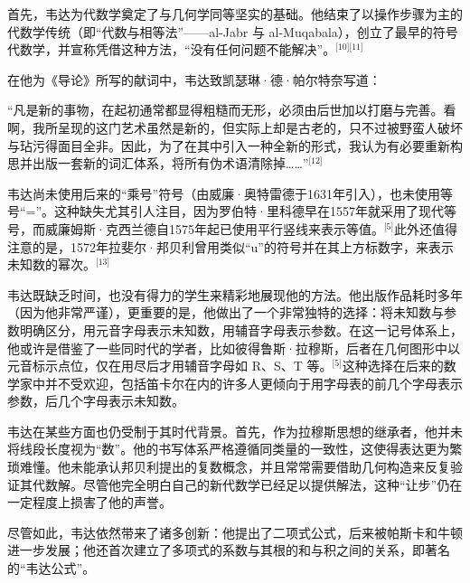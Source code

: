 首先，韦达为代数学奠定了与几何学同等坚实的基础。他结束了以操作步骤为主的代数学传统（即“代数与相等法”——al-Jabr 与 al-Muqabala），创立了最早的符号代数学，并宣称凭借这种方法，“没有任何问题不能解决”。\(^\text{[10][11]}\)

在他为《导论》所写的献词中，韦达致凯瑟琳·德·帕尔特奈写道：

“凡是新的事物，在起初通常都显得粗糙而无形，必须由后世加以打磨与完善。看啊，我所呈现的这门艺术虽然是新的，但实际上却是古老的，只不过被野蛮人破坏与玷污得面目全非。因此，为了在其中引入一种全新的形式，我认为有必要重新构思并出版一套新的词汇体系，将所有伪术语清除掉……”\(^\text{[12]}\)

韦达尚未使用后来的“乘号”符号（由威廉·奥特雷德于1631年引入），也未使用等号“=”。这种缺失尤其引人注目，因为罗伯特·里科德早在1557年就采用了现代等号，而威廉姆斯·克西兰德自1575年起已使用平行竖线来表示等值。\(^\text{[5]}\)此外还值得注意的是，1572年拉斐尔·邦贝利曾用类似“u”的符号并在其上方标数字，来表示未知数的幂次。\(^\text{[13]}\)

韦达既缺乏时间，也没有得力的学生来精彩地展现他的方法。他出版作品耗时多年（因为他非常严谨），更重要的是，他做出了一个非常独特的选择：将未知数与参数明确区分，用元音字母表示未知数，用辅音字母表示参数。在这一记号体系上，他或许是借鉴了一些同时代的学者，比如彼得鲁斯·拉穆斯，后者在几何图形中以元音标示点位，仅在用尽后才用辅音字母如 R、S、T 等。\(^\text{[5]}\)这种选择在后来的数学家中并不受欢迎，包括笛卡尔在内的许多人更倾向于用字母表的前几个字母表示参数，后几个字母表示未知数。

韦达在某些方面也仍受制于其时代背景。首先，作为拉穆斯思想的继承者，他并未将线段长度视为“数”。他的书写体系严格遵循同类量的一致性，这使得表达更为繁琐难懂。他未能承认邦贝利提出的复数概念，并且常常需要借助几何构造来反复验证其代数解。尽管他完全明白自己的新代数学已经足以提供解法，这种“让步”仍在一定程度上损害了他的声誉。

尽管如此，韦达依然带来了诸多创新：他提出了二项式公式，后来被帕斯卡和牛顿进一步发展；他还首次建立了多项式的系数与其根的和与积之间的关系，即著名的“韦达公式”。
